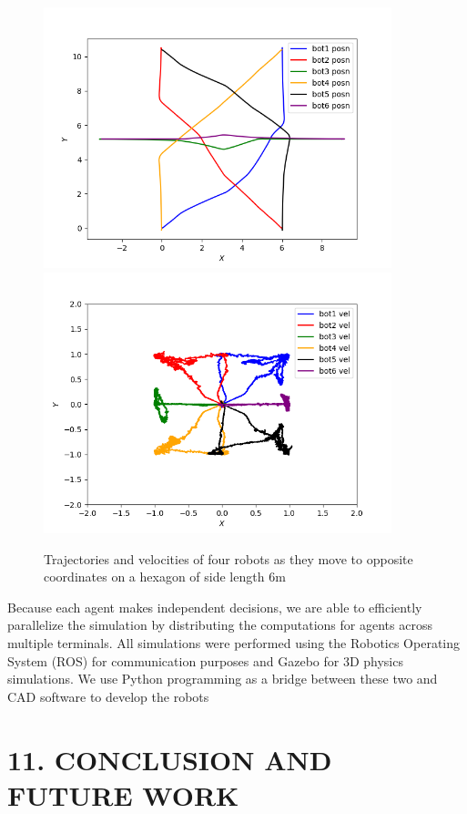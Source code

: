 \documentclass[12pt]{report}
\begin{document}
\renewcommand{\thefigure}{9}
\begin{figure}[h]
	\centering
	\includegraphics[width=0.9\textwidth]{6bot_pos.png}
	\includegraphics[width=0.9\textwidth]{6bot_vel.png}
	\caption{Trajectories and velocities of four robots as they move to opposite coordinates on a hexagon of side length 6m}  \label{fig:6bot}
\end{figure}

Because each agent makes independent decisions, we are able to efficiently parallelize the simulation by distributing the computations for agents across multiple terminals. All simulations were performed using the Robotics Operating System (ROS) for communication purposes and Gazebo for 3D physics simulations. We use Python programming as a bridge between these two and CAD software to develop the robots


\chapter*{11. CONCLUSION AND FUTURE WORK}
\end{document}
